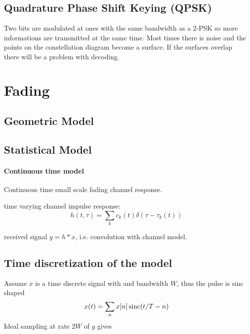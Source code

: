 \subsection{Quadrature Phase Shift Keying (QPSK)}

Two bits are modulated at ones with the same bandwidth as a 2-PSK so more informations are transmitted at the same time. \cite{Meyer2011}
Most times there is noise and the points on the constellation diagram become a surface. 
If the surfaces overlap there will be a problem with decoding. 

\section{Fading}

\subsection{Geometric Model}


\subsection{Statistical Model}


\paragraph{Continuous time model}

Continuous time small scale fading channel response.

time varying channel impulse response:
\begin{equation}
	h(t, \tau) = \sum_k c_k (t) \delta(\tau - \tau_k(t))
\end{equation}

received signal \(y = h * x\), i.e. convolution with channel model. 

\subsection{Time discretization of the model}


Assume \(x\) is a time discrete signal with and bandwidth \(W\), thus the pulse is sinc shaped
\begin{equation}
	x(t) = \sum_n x[n] \operatorname{sinc}(t/T - n)
\end{equation}
Ideal sampling at rate \(2W\) of \(y\) gives
